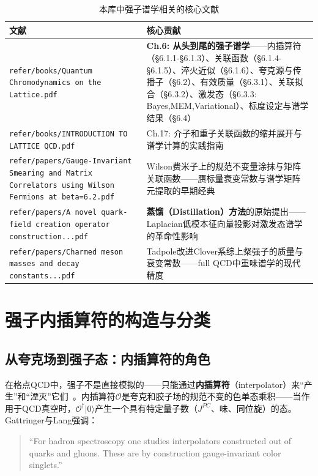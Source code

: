\documentclass[12pt,a4paper]{ctexart}
\theoremstyle{definition}
\begin{document}
\begin{table}[H]
\centering
\caption{本库中强子谱学相关的核心文献}
\label{tab:spec_papers}
\small
\begin{tabular}{lp{9cm}}
\toprule
文献 & 核心贡献 \\
\midrule
\texttt{refer/books/Quantum Chromodynamics on the Lattice.pdf}~\cite{GattringerLang2010} & \textbf{Ch.6: 从头到尾的强子谱学}——内插算符（§6.1.1-§6.1.3）、关联函数（§6.1.4-§6.1.5）、淬火近似（§6.1.6）、夸克源与传播子（§6.2）、有效质量（§6.3.1）、关联拟合（§6.3.2）、激发态（§6.3.3: Bayes,MEM,Variational）、标度设定与谱学结果（§6.4）\\
\texttt{refer/books/INTRODUCTION TO LATTICE QCD.pdf}~\cite{Gupta1997intro} & Ch.17: 介子和重子关联函数的缩并展开与谱学计算的实践指南 \\
\texttt{refer/papers/Gauge-Invariant Smearing and Matrix Correlators using Wilson Fermions at beta=6.2.pdf} & Wilson费米子上的规范不变量涂抹与矩阵关联函数——赝标量衰变常数与谱学矩阵元提取的早期经典 \\
\texttt{refer/papers/A novel quark-field creation operator construction...pdf} & \textbf{蒸馏（Distillation）方法}的原始提出——Laplacian低模本征向量投影对激发态谱学的革命性影响 \\
\texttt{refer/papers/Charmed meson masses and decay constants...pdf}~\cite{CharmedClover} & Tadpole改进Clover系综上粲强子的质量与衰变常数——full QCD中重味谱学的现代精度 \\
\bottomrule
\end{tabular}
\end{table}

\section{强子内插算符的构造与分类}

\subsection{从夸克场到强子态：内插算符的角色}

在格点QCD中，强子不是直接模拟的——只能通过\textbf{内插算符}（interpolator）来``产生''和``湮灭''它们~\cite{GattringerLang2010}。内插算符$\mathcal{O}$是夸克和胶子场的规范不变的色单态乘积——当作用于QCD真空时，$\mathcal{O}^\dagger|0\rangle$产生一个具有特定量子数（$J^{PC}$、味、同位旋）的态。Gattringer与Lang强调：
\begin{quote}
``For hadron spectroscopy one studies interpolators constructed out of quarks and gluons. These are by construction gauge-invariant color singlets.''~\cite{GattringerLang2010}
\end{quote}
\end{document}
